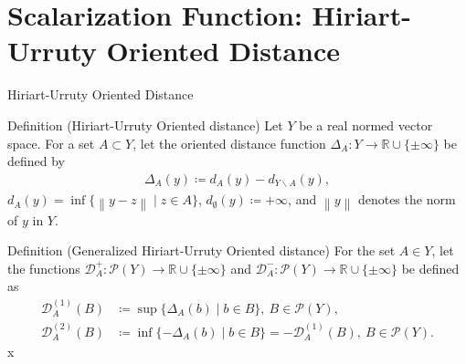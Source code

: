 \documentclass[aspectratio=169, dvipdfmx, 11pt]{beamer}
\newcommand{\RealNumberSet}{\mathbb{R}}
\newcommand{\Norm}[1]{\left\lVert {#1} \right\rVert} %
\begin{document}



\section{Scalarization Function: Hiriart-Urruty Oriented Distance}

\begin{frame}{Hiriart-Urruty Oriented Distance}
  \begin{block}{Definition (Hiriart-Urruty Oriented distance) \cite{xu2016new}}
    Let $Y$ be a real normed vector space. For a set $A \subset Y$, let the oriented distance function
    $\Delta_{A} \colon Y \to \RealNumberSet\cup\{\pm \infty\}$ be defined by
    \begin{align*}
      \Delta_{A}(y) \coloneq d_{A} (y) - d_{Y \backslash A}(y),
    \end{align*}
    $ d_{A} (y)= \inf\{\Norm{y - z} \mid z \in A\}$, $d_{\emptyset} (y) \coloneq + \infty$,
    and $\Norm{y}$ denotes the norm of $y$ in $Y$.
  \end{block}
  \begin{block}{Definition (Generalized Hiriart-Urruty Oriented distance) \cite{xu2016new}}
    For the set $A \in Y$, let the functions $\mathcal{D}^{+}_{A} \colon \mathcal{P}(Y) \to \RealNumberSet \cup \{\pm \infty\}$
    and $\mathcal{D}^{-}_{A} \colon \mathcal{P}(Y) \to \RealNumberSet \cup \{\pm \infty\}$ be defined as
    \begin{align*}
      \mathcal{D}^{(1)}_{A}(B) & \coloneq \sup\{\Delta_{A}(b) \mid b \in B\},\: B \in \mathcal{P}(Y),                              \\
      \mathcal{D}^{(2)}_{A}(B) & \coloneq \inf\{-\Delta_{A}(b) \mid b \in B\} = -\mathcal{D}^{(1)}_{A}(B),\: B \in \mathcal{P}(Y).
    \end{align*}x
  \end{block}
\end{frame}
\end{document}
